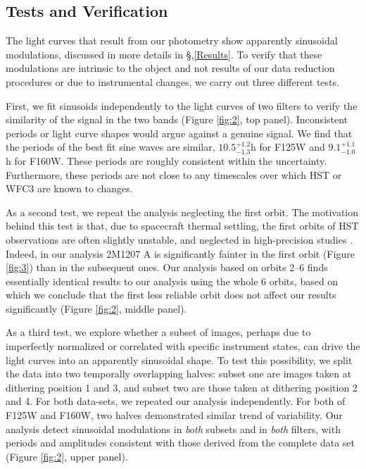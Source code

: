 \documentclass[apj]{emulateapj}
\begin{document}
\subsection{Tests and Verification}

The light curves that result from our photometry show apparently
sinusoidal modulations, discussed in more details in
\S,\ref{Results}. To verify that these modulations are intrinsic to
the object and not results of our data reduction procedures or due to
instrumental changes, we carry out three different tests.

First, we fit sinusoids independently to the light curves of two filters to verify
the similarity of the signal in the two bands (Figure \ref{fig:2}, top
panel). Inconsistent periods or
light curve shapes would argue against a genuine signal.  We find
that the periods of the best fit sine waves are similar,
$10.5^{+1.2}_{-1.3}$h for F125W and $9.1^{+1.1}_{-1.0}$h for
F160W. These periods are roughly consistent within the
uncertainty. Furthermore, these periods are not close to any
timescales over which HST or WFC3 are known to changes.

As a second test, we repeat the analysis neglecting the first
orbit. The motivation behind this test is that, due to spacecraft
thermal settling, the first orbits of HST observations are often
slightly unstable, and neglected in high-precision studies
\citep[e.g.][]{Mandell2013}. Indeed, in our analysis 2M1207 A is
significantly fainter in the first orbit (Figure \ref{fig:3}) than in
the subsequent ones.  Our analysis based on orbits 2--6 finds
essentially identical results to our analysis using the whole 6 orbits, based on
which we conclude that the first less reliable orbit does not affect
our results significantly (Figure \ref{fig:2}, middle panel).

As a third test, we explore whether a subset of images, perhaps due to
imperfectly normalized or correlated with specific instrument states,
can drive the light curves into an apparently sinusoidal shape. To
test this possibility, we split the data into two temporally
overlapping halves: subset one are images taken at dithering position
1 and 3, and subset two are those taken at dithering position 2 and
4. For both data-sets, we repeated our analysis independently.  For
both of F125W and F160W, two halves demonstrated similar trend of
variability.  Our analysis detect sinusoidal modulations in {\em
  both} subsets and in {\em both} filters, with periods and
amplitudes consistent with those derived from the complete data set
(Figure \ref{fig:2}, upper panel).
 
\end{document}
